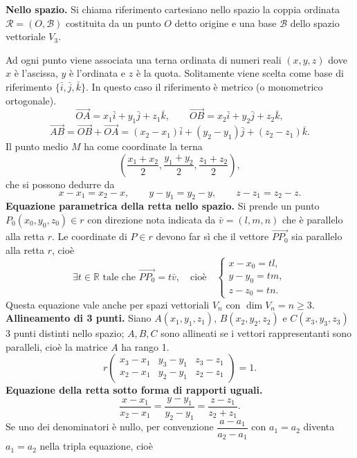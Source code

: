 \documentclass[11pt,a4paper]{article}
\newcommand{\pagina}[1]{\clearpage}
\begin{document}
\textbf{Nello spazio.} Si chiama riferimento cartesiano nello spazio la coppia ordinata $\mathcal R=(O,\mathcal B)$ costituita da un punto $O$ detto origine e una base $\mathcal B$ dello spazio vettoriale $V_3$.

\pagina{58}
Ad ogni punto viene associata una terna ordinata di numeri reali $(x,y,z)$ dove $x$ è l'ascissa, $y$ è l'ordinata e $z$ è la quota.
Solitamente viene scelta come base di riferimento $\{\bar i,\bar j,\bar k\}$. In questo caso il riferimento è metrico (o monometrico ortogonale).
\[\overrightarrow{OA}=x_1\bar i+y_1\bar j+z_1\bar k,\qquad\overrightarrow{OB}=x_2\bar i+y_2\bar j+z_2\bar k,\]
\[\overrightarrow{AB}=\overrightarrow{OB}+\overrightarrow{OA}=(x_2-x_1)\bar i+(y_2-y_1)\bar j+(z_2-z_1)\bar k.\]
Il punto medio $M$ ha come coordinate la terna
\[\left(\frac{x_1+x_2}{2},\frac{y_1+y_2}{2},\frac{z_1+z_2}{2}\right),\]
che si possono dedurre da
\[x-x_1=x_2-x,\qquad y-y_1=y_2-y,\qquad z-z_1=z_2-z.\]
\textbf{Equazione parametrica della retta nello spazio.} Si prende un punto $P_0(x_0,y_0,z_0)\in r$ con direzione nota indicata da $\bar v=(l,m,n)$ che è parallelo alla retta $r$.
Le coordinate di $P\in r$ devono far sì che il vettore $\overrightarrow{PP_0}$ sia parallelo alla retta $r$, cioè
\[\exists t\in\mathbb R\text{ tale che }\overrightarrow{PP_0}=t\bar v,\quad\text{cioè}\quad\begin{cases}x-x_0=tl,\\y-y_0=tm,\\z-z_0=tn.\end{cases}\]
Questa equazione vale anche per spazi vettoriali $V_n$ con $\dim V_n=n\ge3$.
\pagina{59}
\textbf{Allineamento di 3 punti.} Siano $A(x_1,y_1,z_1)$, $B(x_2,y_2,z_2)$ e $C(x_3,y_3,z_3)$ 3 punti distinti nello spazio; $A,B,C$ sono allineati se i vettori rappresentanti sono paralleli, cioè la matrice $A$ ha rango 1.
\[r\begin{pmatrix}x_3-x_1&y_3-y_1&z_3-z_1\\x_2-x_1&y_2-y_1&z_2-z_1\end{pmatrix}=1.\]
\textbf{Equazione della retta sotto forma di rapporti uguali.}
\[\frac{x-x_1}{x_2-x_1}=\frac{y-y_1}{y_2-y_1}=\frac{z-z_1}{z_2+z_1}.\]
Se uno dei denominatori è nullo, per convenzione $\dfrac{a-a_1}{a_2-a_1}$ con $a_1=a_2$ diventa $a_1=a_2$ nella tripla equazione, cioè
\end{document}
